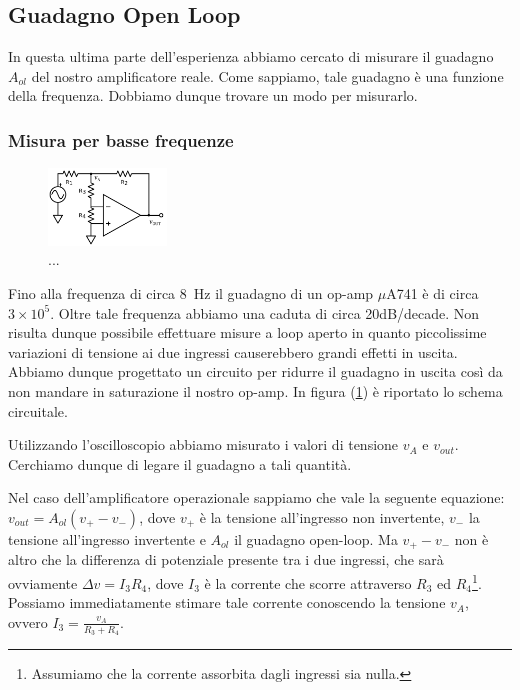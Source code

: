 \subsection{Guadagno Open Loop}

In questa ultima parte dell'esperienza abbiamo cercato di misurare il guadagno $A_{ol}$ del nostro amplificatore reale. Come sappiamo, tale guadagno è una funzione della frequenza. Dobbiamo dunque trovare un modo per misurarlo.

\subsubsection{Misura per basse frequenze}

\begin{figure}
  \begin{center}
    \includegraphics[width=0.280\textwidth]{../E03/latex/LF_ol.pdf}
  \end{center}
  \caption{...}
  \label{cir3:low_frequency}
\end{figure}


Fino alla frequenza di circa \SI{8}{\hertz} il guadagno di un op-amp $\mu$A741 è di circa $3\times 10^5$. Oltre tale frequenza abbiamo una caduta di circa 20dB/decade. Non risulta dunque possibile effettuare misure a loop aperto in quanto piccolissime variazioni di tensione ai due ingressi causerebbero grandi effetti in uscita. Abbiamo dunque progettato un circuito per ridurre il guadagno in uscita così da non mandare in saturazione il nostro op-amp. In figura (\ref{cir3:low_frequency}) è riportato lo schema circuitale.  

Utilizzando l'oscilloscopio abbiamo misurato i valori di tensione $v_A$ e $v_{out}$. Cerchiamo dunque di legare il guadagno a tali quantità.

Nel caso dell'amplificatore operazionale sappiamo che vale la seguente equazione: $v_{out}=A_{ol}(v_+-v_-)$, dove $v_+$ è la tensione all'ingresso non invertente, $v_-$ la tensione all'ingresso invertente e $A_{ol}$ il guadagno open-loop. Ma $v_+-v_-$ non è altro che la differenza di potenziale presente tra i due ingressi, che sarà ovviamente $\Delta v = I_3R_4$, dove $I_3$ è la corrente che scorre attraverso $R_3$ ed $R_4$\footnote{Assumiamo che la corrente assorbita dagli ingressi sia nulla.}. Possiamo immediatamente stimare tale corrente conoscendo la tensione $v_A$, ovvero $I_3=\frac{v_A}{R_3+R_4}$. 


